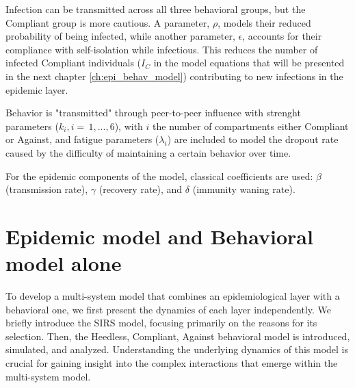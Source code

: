 Infection can be transmitted across all three behavioral groups, but the Compliant group is more cautious. A parameter, $\rho$, models their reduced probability of being infected, while another parameter, $\epsilon$, accounts for their compliance with self-isolation while infectious. This reduces the number of infected Compliant individuals ($I_C$ in the model equations that will be presented in the next chapter \ref{ch:epi_behav_model}) contributing to new infections in the epidemic layer.

Behavior is "transmitted" through peer-to-peer influence with strenght parameters ($k_i, i = \,1,...,6$), with $i$ the number of compartments either Compliant or Against, and fatigue parameters ($\lambda_i$) are included to model the dropout rate caused by the difficulty of maintaining a certain behavior over time.

For the epidemic components of the model, classical coefficients are used: $\beta$ (transmission rate), $\gamma$ (recovery rate), and $\delta$ (immunity waning rate).
 

\chapter{Epidemic model and Behavioral model alone}
\label{ch:model_alone}

To develop a multi-system model that combines an epidemiological layer with a behavioral one, we first present the dynamics of each layer independently. We briefly introduce the SIRS model, focusing primarily on the reasons for its selection. Then, the Heedless, Compliant, Against behavioral model is introduced, simulated, and analyzed. Understanding the underlying dynamics of this model is crucial for gaining insight into the complex interactions that emerge within the multi-system model.


